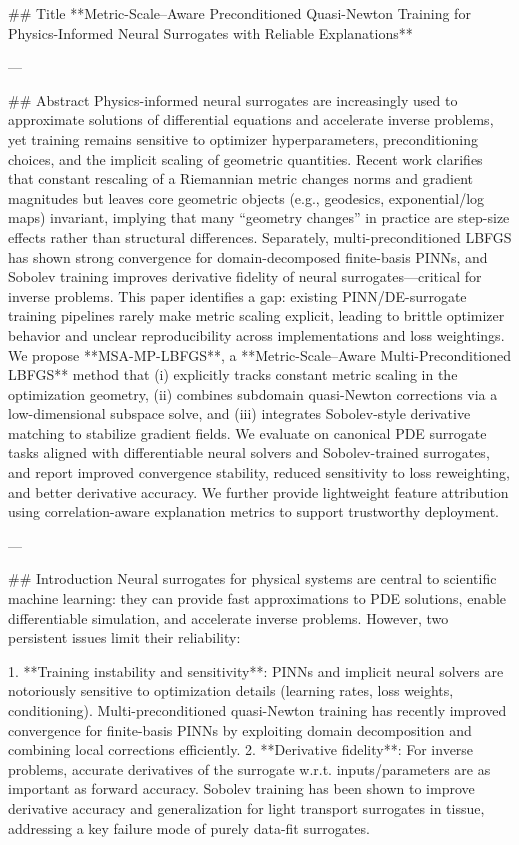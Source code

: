 ## Title  
**Metric-Scale–Aware Preconditioned Quasi-Newton Training for Physics-Informed Neural Surrogates with Reliable Explanations**

---

## Abstract  
Physics-informed neural surrogates are increasingly used to approximate solutions of differential equations and accelerate inverse problems, yet training remains sensitive to optimizer hyperparameters, preconditioning choices, and the implicit scaling of geometric quantities. Recent work clarifies that constant rescaling of a Riemannian metric changes norms and gradient magnitudes but leaves core geometric objects (e.g., geodesics, exponential/log maps) invariant, implying that many “geometry changes” in practice are step-size effects rather than structural differences. Separately, multi-preconditioned LBFGS has shown strong convergence for domain-decomposed finite-basis PINNs, and Sobolev training improves derivative fidelity of neural surrogates—critical for inverse problems. This paper identifies a gap: existing PINN/DE-surrogate training pipelines rarely make metric scaling explicit, leading to brittle optimizer behavior and unclear reproducibility across implementations and loss weightings. We propose **MSA-MP-LBFGS**, a **Metric-Scale–Aware Multi-Preconditioned LBFGS** method that (i) explicitly tracks constant metric scaling in the optimization geometry, (ii) combines subdomain quasi-Newton corrections via a low-dimensional subspace solve, and (iii) integrates Sobolev-style derivative matching to stabilize gradient fields. We evaluate on canonical PDE surrogate tasks aligned with differentiable neural solvers and Sobolev-trained surrogates, and report improved convergence stability, reduced sensitivity to loss reweighting, and better derivative accuracy. We further provide lightweight feature attribution using correlation-aware explanation metrics to support trustworthy deployment.

---

## Introduction  
Neural surrogates for physical systems are central to scientific machine learning: they can provide fast approximations to PDE solutions, enable differentiable simulation, and accelerate inverse problems. However, two persistent issues limit their reliability:

1. **Training instability and sensitivity**: PINNs and implicit neural solvers are notoriously sensitive to optimization details (learning rates, loss weights, conditioning). Multi-preconditioned quasi-Newton training has recently improved convergence for finite-basis PINNs by exploiting domain decomposition and combining local corrections efficiently.  
2. **Derivative fidelity**: For inverse problems, accurate derivatives of the surrogate w.r.t. inputs/parameters are as important as forward accuracy. Sobolev training has been shown to improve derivative accuracy and generalization for light transport surrogates in tissue, addressing a key failure mode of purely data-fit surrogates.

